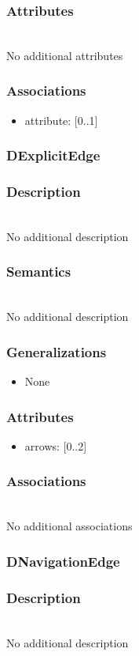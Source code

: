 \documentclass{article}
\begin{document}
\subsubsection*{Attributes} ~\\ No additional attributes
\subsubsection*{Associations}
\begin{itemize}
\item attribute:  [0..1] 
\end{itemize}
\subsubsection{DExplicitEdge}\label{DExplicitEdge} 
\subsubsection*{Description} ~\\ No additional description
\subsubsection*{Semantics} ~\\ No additional description
\subsubsection*{Generalizations}
\begin{itemize}
\item None
\end{itemize}
\subsubsection*{Attributes}
\begin{itemize}
\item arrows:  [0..2] 
\end{itemize}
\subsubsection*{Associations} ~\\ No additional associations
\subsubsection{DNavigationEdge}\label{DNavigationEdge} 
\subsubsection*{Description} ~\\ No additional description
\end{document}
